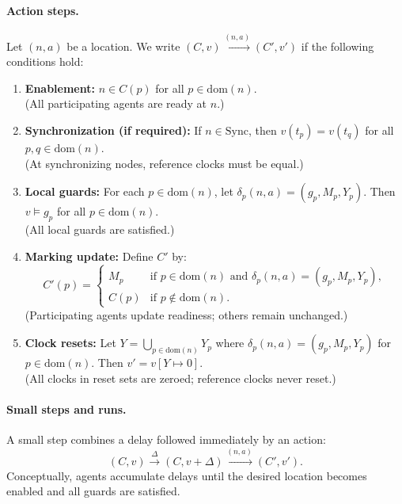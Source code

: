 \paragraph{Action steps.}
\begin{definition}
\label{def:action-step}
Let $(n, a)$ be a location. We write $(C, v) \xrightarrow{(n,a)} (C', v')$ if the following conditions hold:

\begin{enumerate}
\item \textbf{Enablement:} $n \in C(p)$ for all $p \in \text{dom}(n)$. \\
(All participating agents are ready at $n$.)

\item \textbf{Synchronization (if required):} If $n \in \text{Sync}$, then $v(t_p) = v(t_q)$ for all $p, q \in \text{dom}(n)$. \\
(At synchronizing nodes, reference clocks must be equal.)

\item \textbf{Local guards:} For each $p \in \text{dom}(n)$, let $\delta_p(n, a) = (g_p, M_p, Y_p)$. Then $v \models g_p$ for all $p \in \text{dom}(n)$. \\
(All local guards are satisfied.)

\item \textbf{Marking update:} Define $C'$ by:
\[
C'(p) = \begin{cases}
M_p & \text{if } p \in \text{dom}(n) \text{ and } \delta_p(n,a) = (g_p, M_p, Y_p), \\
C(p) & \text{if } p \notin \text{dom}(n).
\end{cases}
\]
(Participating agents update readiness; others remain unchanged.)

\item \textbf{Clock resets:} Let $Y = \bigcup_{p \in \text{dom}(n)} Y_p$ where $\delta_p(n,a) = (g_p, M_p, Y_p)$ for $p \in \text{dom}(n)$. Then $v' = v[Y \mapsto 0]$. \\
(All clocks in reset sets are zeroed; reference clocks never reset.)
\end{enumerate}
\end{definition}

\paragraph{Small steps and runs.}
\begin{definition}
A \textsf{small step} combines a delay followed immediately by an action:
\[
(C, v) \xrightarrow{\Delta} (C, v + \Delta) \xrightarrow{(n,a)} (C', v').
\]
Conceptually, agents accumulate delays until the desired location becomes enabled and all guards are satisfied.
\end{definition}


